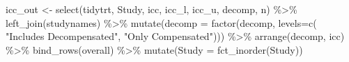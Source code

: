 \documentclass[
]{article}
\newenvironment{Shaded}{\begin{snugshade}}{\end{snugshade}}
\newcommand{\AttributeTok}[1]{\textcolor[rgb]{0.77,0.63,0.00}{#1}}
\newcommand{\FunctionTok}[1]{\textcolor[rgb]{0.00,0.00,0.00}{#1}}
\newcommand{\NormalTok}[1]{#1}
\newcommand{\OtherTok}[1]{\textcolor[rgb]{0.56,0.35,0.01}{#1}}
\newcommand{\SpecialCharTok}[1]{\textcolor[rgb]{0.00,0.00,0.00}{#1}}
\newcommand{\StringTok}[1]{\textcolor[rgb]{0.31,0.60,0.02}{#1}}
\begin{document}
\begin{Shaded}
\begin{Highlighting}[]
\NormalTok{icc\_out }\OtherTok{\textless{}{-}} \FunctionTok{select}\NormalTok{(tidytrt, Study, icc, icc\_l, icc\_u, decomp, n) }\SpecialCharTok{\%\textgreater{}\%} 
  \FunctionTok{left\_join}\NormalTok{(studynames) }\SpecialCharTok{\%\textgreater{}\%} 
  \FunctionTok{mutate}\NormalTok{(}\AttributeTok{decomp =} \FunctionTok{factor}\NormalTok{(decomp, }\AttributeTok{levels=}\FunctionTok{c}\NormalTok{(}
    \StringTok{"Includes Decompensated"}\NormalTok{, }\StringTok{"Only Compensated"}\NormalTok{))) }\SpecialCharTok{\%\textgreater{}\%} 
  \FunctionTok{arrange}\NormalTok{(decomp, icc) }\SpecialCharTok{\%\textgreater{}\%} 
  \FunctionTok{bind\_rows}\NormalTok{(overall) }\SpecialCharTok{\%\textgreater{}\%} 
  \FunctionTok{mutate}\NormalTok{(}\AttributeTok{Study =} \FunctionTok{fct\_inorder}\NormalTok{(Study))}


\end{Highlighting}
\end{Shaded}
\end{document}
